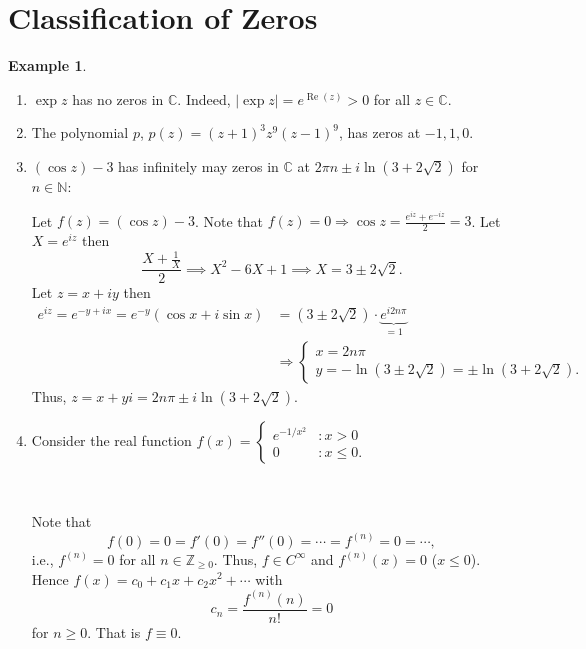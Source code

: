 \documentclass[12pt,openany]{book}
\theoremstyle{definition}
\newtheorem{example}{Example}[section]
\newcommand{\N}{\mathbb{N}}
\newcommand{\Z}{\mathbb{Z}}
\newcommand{\C}{\mathbb{C}}
\newcommand{\of}[1]{\left( #1 \right)}
\newcommand{\abs}[1]{\left\lvert #1 \right\rvert}
\renewcommand{\Re}{\operatorname{Re}}
\newcommand{\ie}{\textnormal{i.e.}}
\begin{document}
	\section{Classification of Zeros}
	\begin{example}
		\ \begin{enumerate}[(1)]
			\item $\exp z$ has no zeros in $\C$. Indeed, $\abs{\exp z}=e^{\Re(z)}>0$ for all $z\in\C$.
			\item The polynomial $p$, $p(z)=(z+1)^3z^9(z-1)^9$, has zeros at $-1, 1, 0$.
			\item $(\cos z)-3$ has infinitely may zeros in $\C$ at $2\pi n\pm i\ln(3+2\sqrt{2})$ for $n\in\N$:
			
			Let $f(z)=\of{\cos z}-3$. Note that $f(z)=0\Rightarrow\cos z=\frac{e^{iz}+e^{-iz}}{2}=3$. Let $X=e^{iz}$ then \[
			\frac{X+\frac{1}{X}}{2}\implies X^2-6X+1\implies X=3\pm 2\sqrt{2}.
			\] Let $z=x+iy$ then \begin{align*}
			e^{iz}=e^{-y+ix}=e^{-y}\of{\cos x+i\sin x}
			&=(3\pm2\sqrt{2})\cdot \underbrace{e^{i2n\pi}}_{=1}\\
			&\Rightarrow\begin{cases}
			x = 2n\pi\\
			y = -\ln(3\pm 2\sqrt{2})=\pm\ln(3+ 2\sqrt{2}).
			\end{cases}
			\end{align*} Thus, $z=x+yi=2n\pi\pm i\ln(3+2\sqrt{2})$.
			\item 
			Consider the real function $f(x)=\begin{cases}
			e^{-1/x^2} &:x>0\\
			0 &:x\leq 0.
			\end{cases}$
			\begin{center}
				\\
			\end{center} Note that \[
			f(0)=0=f'(0)=f''(0)=\cdots=f^{(n)}=0=\cdots,
			\] \ie, $f^{(n)}=0$ for all $n\in\Z_{\geq 0}$. Thus, $f\in C^\infty$ and $f^{(n)}(x)=0$ ($x\leq 0$). Hence $f(x)=c_0+c_1x+c_2x^2+\cdots$ with \[
			c_n=\frac{f^{(n)}(n)}{n!}=0
			\] for $n\geq 0$. That is $f\equiv 0$.
		\end{enumerate}
	\end{example}
\end{document}
